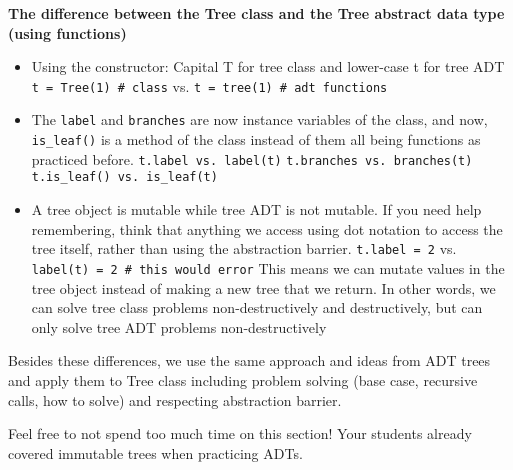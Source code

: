 \vspace{2mm}
\textbf{The difference between the Tree class and the Tree abstract data type (using functions)}
\begin{itemize}
\item Using the constructor: Capital T for tree class and lower-case t for tree ADT
    \subitem \lstinline{t = Tree(1) # class} vs. \lstinline{t = tree(1) # adt functions}
\item The \lstinline{label} and \lstinline{branches} are now instance variables of the class, and now, \lstinline{is_leaf()} is a method of the class instead of them all being functions as practiced before.
    \subitem \lstinline{t.label vs. label(t)}
    \subitem \lstinline{t.branches vs. branches(t)}
    \subitem \lstinline{t.is_leaf() vs. is_leaf(t)}
\item A tree object is mutable while tree ADT is not mutable. If you need help remembering, think that anything we access using dot notation to access the tree itself, rather than using the abstraction barrier.
    \subitem \lstinline{t.label = 2} vs. \lstinline{label(t) = 2 # this would error}
    \subitem This means we can mutate values in the tree object instead of making a new tree that we return. In other words, we can solve tree class problems non-destructively and destructively, but can only solve tree ADT problems non-destructively
\end{itemize}
Besides these differences, we use the same approach and ideas from ADT trees and apply them to Tree class including problem solving (base case, recursive calls, how to solve)  and respecting abstraction barrier. 

\begin{meta}
Feel free to not spend too much time on this section! Your students already covered immutable trees when practicing ADTs.  
\end{meta}
